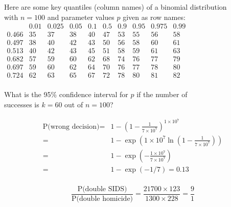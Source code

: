 \documentclass{article}
\begin{document}
\vspace{1cm}

\noindent\begin{minipage}{\linewidth}

Here are some key quantiles (column names) of a binomial distribution\\
with \(n=100\) and parameter values \(p\) given as row names:\\

\( \begin{array}{c|cccccccccc}
  ~ & 0.01 & 0.025 & 0.05 & 0.1 & 0.5 & 0.9 & 0.95 & 0.975 & 0.99 \\ \hline
  0.466 & 35 & 37 & 38 & 40 & 47 & 53 & 55 & 56 & 58 \\
  0.497 & 38 & 40 & 42 & 43 & 50 & 56 & 58 & 60 & 61 \\
  0.513 & 40 & 42 & 43 & 45 & 51 & 58 & 59 & 61 & 63 \\
  0.682 & 57 & 59 & 60 & 62 & 68 & 74 & 76 & 77 & 79 \\
  0.697 & 59 & 60 & 62 & 64 & 70 & 76 & 77 & 78 & 80 \\
  0.724 & 62 & 63 & 65 & 67 & 72 & 78 & 80 & 81 & 82 \\
\end{array} \)\medskip

What  is the  95\%  confidence interval  for \(p\)  if  the number  of\\
successes is \(k=60\) out of \(n=100\)?

\vspace{1cm}

\end{minipage}

\begin{align*}
  \mbox{P(wrong decision)} = & 1 - \left(1 - \frac{1}{7\times{10}^7}\right)^{1\times{10}^7} \\
  = & 1 - \exp\!\left(1\times{10}^7 \ln\!\left(1 - \frac{1}{7\times{10}^7}\right)\right) \\
  = & 1 - \exp\!\left(-\frac{1\times{10}^7}{7\times{10}^7}\right) \\
  = & 1 - \exp(-1/7) = 0.13 \\
\end{align*}

\[
\frac{\mbox{P(double SIDS)}}{\mbox{P(double homicide)}} = \frac{21700 \times 123}{1300 \times 228} = \frac{9}{1}
\]
\end{document}
